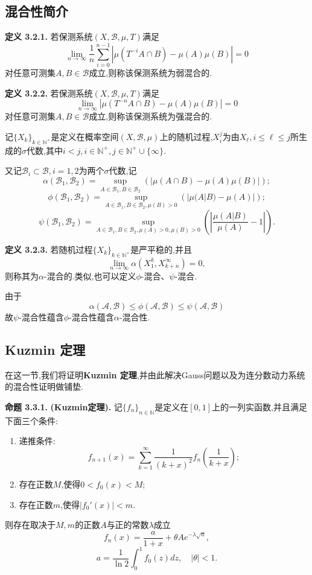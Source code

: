 \subsection{混合性简介}
\textbf{定义 3.2.1.  }
若保测系统$(X,\mathcal{B},\mu,T)$满足
$$\lim_{n\to\infty}{\frac{1}{n}}\sum_{i=0}^{n-1}|\mu(T^{-i}A\cap B)-\mu(A){\mu}(B)|=0$$
对任意可测集$A,B\in\mathcal{B}$成立,则称该保测系统为弱混合的.
\par
\textbf{定义 3.2.2.  }
若保测系统$(X,\mathcal{B},\mu,T)$满足
$$\lim\limits_{n\to\infty}\left|\mu(T^{-n}A\cap B)-\mu(A)\mu(B)\right|=0$$
对任意可测集$A,B\in\mathcal{B}$成立,则称该保测系统为强混合的.
\par
记$\{X_k\}_{k\in\mathbb{N^+}}$是定义在概率空间$(X,\mathcal{B},\mu)$上的随机过程,$X_{i}^{j}$为由$X_{\ell},i\leqslant\ell\leqslant j$所生成的$\sigma$代数,其中$i< j,i\in\mathbb{N}^+,j\in\mathbb{N}^+\cup\{\infty\}$.\par
又记$\mathcal{B}_i\subset\mathcal{B},i=1,2$为两个$\sigma$代数,记
$$\alpha(\mathcal{B}_1,\mathcal{B}_2)=\sup_{A\in\mathcal{B}_1,B\in\mathcal{B}_2}\left(|\mu(A\cap B)-\mu(A)\mu(B)|\right);$$
$$\phi(\mathcal{B}_1,\mathcal{B}_2)=\sup_{A\in\mathcal{B}_1,B\in\mathcal{B}_2,\mu(B)>0}\left(|\mu(A|B)-\mu(A)|\right);$$
$$\psi(\mathcal{B}_1,\mathcal{B}_2)=\sup_{A\in\mathcal{B}_1,B\in\mathcal{B}_2,\mu(A)>0,\mu(B)>0}\left(\left|\frac{\mu(A|B)}{\mu(A)}-1\right|\right).$$
\par
\textbf{定义 3.2.3.  }
若随机过程$\{X_k\}_{k\in\mathbb{N^+}}$是严平稳的,并且
$$\lim_{n\to\infty}\alpha(X_{1}^{k},X_{k+n}^{\infty})=0,$$
则称其为$\alpha$-混合的.类似,也可以定义$\phi$-混合、$\psi$-混合.
\par
由于
$$\alpha(\mathcal{A},\mathcal{B})\leqslant\phi(\mathcal{A},\mathcal{B})\leqslant\psi(\mathcal{A},\mathcal{B})$$
故$\psi$-混合性蕴含$\phi$-混合性蕴含$\alpha$-混合性.
\subsection{Kuzmin 定理}
在这一节,我们将证明\textbf{Kuzmin 定理},并由此解决Gauss问题以及为连分数动力系统的混合性证明做铺垫.\par
\textbf{命题 3.3.1.  }\textsuperscript{\cite{Kuzmin,Khinchin,Iosifescu}}\textbf{(Kuzmin定理).  }
记$\{f_n\}_{n\in\mathbb{N}}$是定义在$[0,1]$上的一列实函数,并且满足下面三个条件:
\begin{enumerate}
    \item 递推条件:
          \begin{equation}\label{recur}
              f_{n+1}(x)=\sum\limits_{k=1}^{\infty}\dfrac{1}{(k+x)^{2}}f_{n}\left(\dfrac{1}{k+x}\right);
          \end{equation}
    \item 存在正数$M$,使得$0<f_0(x)<M$;
    \item 存在正数$m$,使得$|f_0'(x)|<m$.
\end{enumerate}
则存在取决于$M,m$的正数$A$与正的常数$\lambda$成立
\begin{equation}\label{Kuzmin}
    f_{n}\left(x\right)=\frac{a}{1+x}+\theta A e^{-\lambda \sqrt{n}},
\end{equation}
$$a=\frac{1}{\ln2}\int_{0}^{1}f_{0}(z)d z,\quad|\theta|<1.$$
\par

